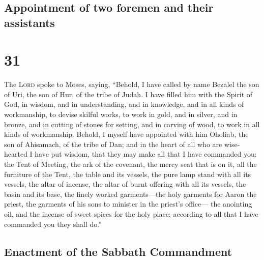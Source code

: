 \hypertarget{appointment-of-two-foremen-and-their-assistants}{%
\subsection{Appointment of two foremen and their
assistants}\label{appointment-of-two-foremen-and-their-assistants}}

\hypertarget{section-30}{%
\section{31}\label{section-30}}

 The \textsc{Lord} spoke to Moses, saying, 
``Behold, I have called by name Bezalel the son of Uri, the son of Hur,
of the tribe of Judah.  I have filled him with the Spirit
of God, in wisdom, and in understanding, and in knowledge, and in all
kinds of workmanship,  to devise skilful works, to work in
gold, and in silver, and in bronze,  and in cutting of
stones for setting, and in carving of wood, to work in all kinds of
workmanship.  Behold, I myself have appointed with him
Oholiab, the son of Ahisamach, of the tribe of Dan; and in the heart of
all who are wise-hearted I have put wisdom, that they may make all that
I have commanded you:  the Tent of Meeting, the ark of the
covenant, the mercy seat that is on it, all the furniture of the Tent,
 the table and its vessels, the pure lamp stand with all
its vessels, the altar of incense,  the altar of burnt
offering with all its vessels, the basin and its base, 
the finely worked garments---the holy garments for Aaron the priest, the
garments of his sons to minister in the priest's office---
 the anointing oil, and the incense of sweet spices for
the holy place: according to all that I have commanded you they shall
do.''

\hypertarget{enactment-of-the-sabbath-commandment}{%
\subsection{Enactment of the Sabbath
Commandment}\label{enactment-of-the-sabbath-commandment}}

